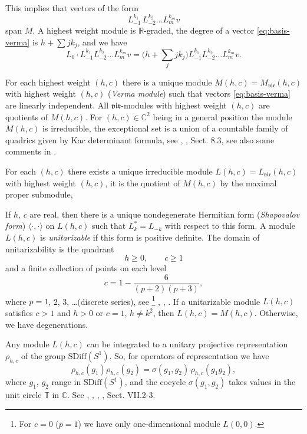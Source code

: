 \documentclass[]{amsart}
\def\ge{\geqslant}
\def\la{\langle}
\def\ra{\rangle}
\def\R {{\mathbb R }}
\def\C {{\mathbb C }}
\def\T{\mathbb T}
\def\sm{\smallskip}
\def\SDiff{\mathrm{SDiff}}
\def\vir{\mathfrak{vir}}
\begin{document}
This implies that vectors of the form 
\begin{equation}
L_{-1}^{k_1} \, L_{-2}^{k_2}\dots L_m^{k_m} v
\label{eq:basis-verma}
\end{equation}
span $M$.
A highest weight module is $\R$-graded, the degree of a
vector \eqref{eq:basis-verma} is $h+\sum jk_j$,
and we have
$$
L_0\cdot L_{-1}^{k_1} L_{-2}^{k_2}\dots L_m^{k_m} v
= \bigl(h+\sum_j jk_j\bigr) L_{-1}^{k_1} L_{-2}^{k_2}\dots L_m^{k_m} v
.$$

 For each highest weight
$(h,c)$ there is a unique module $M(h,c)=M_\vir(h,c)$ with highest weight $(h,c)$ ({\it Verma module}) such that vectors 
\eqref{eq:basis-verma} are linearly independent. All $\vir$-modules with highest weight $(h,c)$ are quotients
of $M(h,c)$. 
For $(h,c)\in\C^2$ being in a general position the module $M(h,c)$ is irreducible, the exceptional set
is a union of a countable family of quadrics given by Kac determinant formula, see \cite{Kac}, \cite{KR}, Sect. 8.3, see also some comments
in \cite{Ner-aff}.

For each $(h,c)$ there exists a unique  
 irreducible 
module $L(h,c)=L_\vir(h,c)$ with highest weight $(h,c)$, it is the quotient of $M(h,c)$ by the maximal
proper submodule, 

\sm

If $h$, $c$ are real, then there is a unique nondegenerate Hermitian form
({\it Shapovalov form}) $\la\cdot,\cdot\ra$ on $L(h,c)$ such that
 $L_k^*=L_{-k}$ with respect to this form.
 A module $L(h,c)$ is {\it unitarizable} if this form is positive definite.
 The domain of unitarizability is the quadrant
 $$h\ge 0,\qquad c\ge 1$$
  and a finite collection of points
 on each level 
 $$c=1-\frac{6}{(p+2)(p+3)},$$
  where $p=1$, 2, 3, \dots (discrete series),
 see%
 \footnote{For $c=0$ ($p=1$) we have only one-dimensional 
module $L(0,0)$.} 
 \cite{Ner-disser}, \cite{Fri0}, \cite{GOK}.
 If  a unitarizable module $L(h,c)$ satisfies $c>1$ and $h>0$  or $c=1$, $h\ne k^2$, then 
 $L(h,c)=M(h,c)$. Otherwise,
 we have degenerations. 
 
\sm 
 
 Any module $L(h,c)$ can be integrated to a unitary projective 
 representation
 $\rho_{h,c}$
 of the group $\SDiff(S^1)$. So, for operators of representation
we have
\begin{equation}
\label{eq:diff-projective}
\rho_{h,c}(g_1)\rho_{h,c}(g_2)=\sigma(g_1,g_2)\, \rho_{h,c}(g_1g_2), 
\end{equation}
where $g_1$, $g_2$ range in  $\SDiff(S^1)$, and
the  cocycle  $\sigma(g_1,g_2)$ takes values in the 
unit circle 
$\T$ in $\C$.
See \cite{Seg1}, \cite{Ner-highest}, \cite{GW}, \cite{Ner-book},
Sect. VII.2-3.
\end{document}
